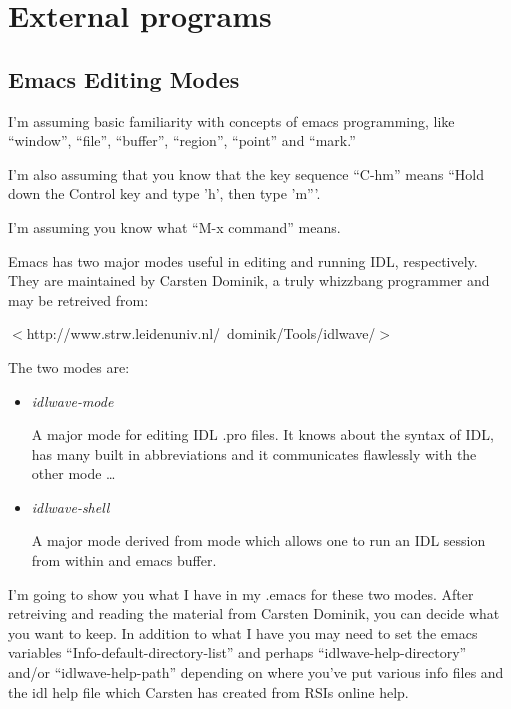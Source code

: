 \section{External programs}\label{sec:qs-external-programs}
\subsection{Emacs Editing Modes}\label{sec:qs-emacs}

  I'm assuming basic familiarity with concepts of emacs programming,
  like ``window'', ``file'', ``buffer'', ``region'', ``point'' and
  ``mark.''

  I'm also assuming that you know that the key sequence ``C-hm'' means
  ``Hold down the Control key and type 'h', then type 'm'''.

  I'm assuming you know what ``M-x command'' means.


  Emacs has two major modes useful in editing and running IDL,
  respectively. They are maintained by Carsten Dominik, a truly
  whizzbang programmer and may be retreived from:

  $<$http://www.strw.leidenuniv.nl/~dominik/Tools/idlwave/$>$

  The two modes are:


  \begin{itemize}
    \item \textit{idlwave-mode}

      A major mode for editing IDL .pro files. It knows about the
      syntax of IDL, has many built in abbreviations and it
      communicates  flawlessly with the other mode \ldots


    \item \textit{idlwave-shell}

      A major mode derived from  mode which allows one to
      run an IDL session from within and emacs buffer.

  \end{itemize}
  
   I'm going to show you what I have in my .emacs for these two
  modes. After retreiving and reading the material from Carsten
  Dominik, you can decide what you want to keep. In addition to what I
  have you may need to set the emacs variables
  ``Info-default-directory-list'' and perhaps
  ``idlwave-help-directory'' and/or ``idlwave-help-path'' depending on
  where you've put various info files and the idl help file which
  Carsten has created from RSIs online help.


